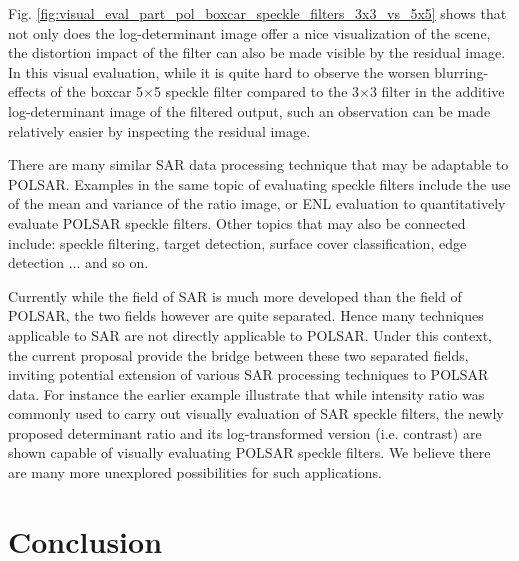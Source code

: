 \documentclass[journal,12pt,draftcls,onecolumn]{IEEEtran}
\begin{document}
Fig. \ref{fig:visual_eval_part_pol_boxcar_speckle_filters_3x3_vs_5x5} shows that not only does the log-determinant image offer a nice visualization of the scene, 
  the distortion impact of the filter can also be made visible by the residual image.
In this visual evaluation, while it is quite hard to observe the worsen blurring-effects of the boxcar 5$\times$5 speckle filter compared to the 3$\times$3 filter
in the additive log-determinant image of the filtered output, 
  such an observation can be made relatively easier by inspecting the residual image.
  

There are many similar SAR data processing technique that may be adaptable to POLSAR.
Examples in the same topic of evaluating speckle filters include
  the use of the mean and variance of the ratio image, or ENL evaluation to quantitatively evaluate POLSAR speckle filters.
Other topics that may also be connected include: speckle filtering, target detection, surface cover classification, edge detection ... and so on.

Currently while the field of SAR is much more developed than the field of POLSAR,
  the two fields however are quite separated.
Hence many techniques applicable to SAR are not directly applicable to POLSAR.
Under this context, the current proposal provide the bridge between these two separated fields,
  inviting potential extension of various SAR processing techniques to POLSAR data.
For instance the earlier example illustrate that while intensity ratio was commonly used to carry out visually evaluation of SAR speckle filters,
  the newly proposed determinant ratio and its log-transformed version (i.e. contrast) are shown capable of visually evaluating POLSAR speckle filters.
We believe there are many more unexplored possibilities for such applications.
  
\section{Conclusion}
\label{sec:conclusion}
\end{document}
